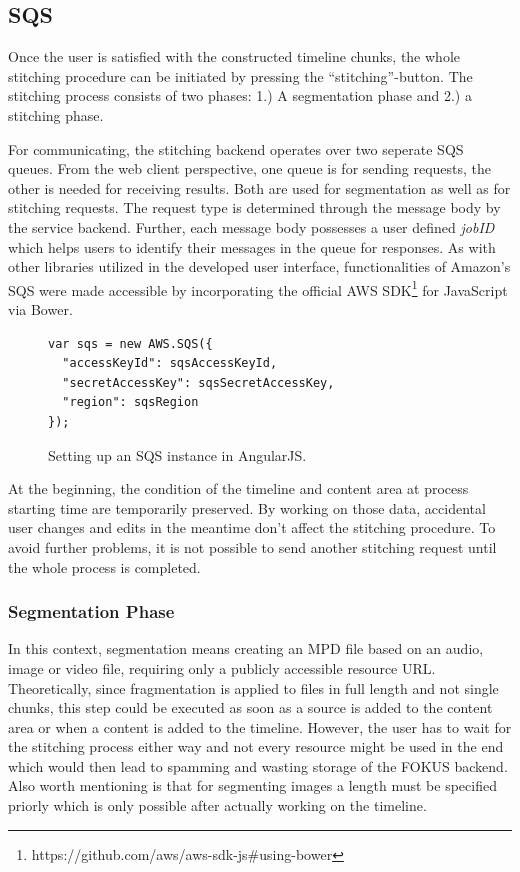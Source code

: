 \documentclass[conference]{IEEEtran}
\begin{document}
\subsection{SQS}
Once the user is satisfied with the constructed timeline chunks, the whole stitching procedure can be initiated by pressing the ``stitching''-button.
The stitching process consists of two phases: 1.) A segmentation phase and 2.) a stitching phase.

For communicating, the stitching backend operates over two seperate SQS queues.
From the web client perspective, one queue is for sending requests, the other is needed for receiving results.
Both are used for segmentation as well as for stitching requests.
The request type is determined through the message body by the service backend.
Further, each message body possesses a user defined \textit{jobID} which helps users to identify their messages in the queue for responses.
As with other libraries utilized in the developed user interface, functionalities of Amazon's SQS were made accessible by incorporating the official AWS SDK\footnote{https://github.com/aws/aws-sdk-js\#using-bower} for JavaScript via Bower.
\begin{figure}[H]
\begin{lstlisting}
var sqs = new AWS.SQS({
  "accessKeyId": sqsAccessKeyId,
  "secretAccessKey": sqsSecretAccessKey,
  "region": sqsRegion
});
\end{lstlisting}
\caption{Setting up an SQS instance in AngularJS.}
\end{figure}
At the beginning, the condition of the timeline and content area at process starting time are temporarily preserved.
By working on those data, accidental user changes and edits in the meantime don't affect the stitching procedure.
To avoid further problems, it is not possible to send another stitching request until the whole process is completed.
\\
\subsubsection{Segmentation Phase}
In this context, segmentation means creating an MPD file based on an audio, image or video file, requiring only a publicly accessible resource URL.
Theoretically, since fragmentation is applied to files in full length and not single chunks, this step could be executed as soon as a source is added to the content area or when a content is added to the timeline.
However, the user has to wait for the stitching process either way and not every resource might be used in the end which would then lead to spamming and wasting storage of the FOKUS backend.
Also worth mentioning is that for segmenting images a length must be specified priorly which is only possible after actually working on the timeline.
\end{document}
